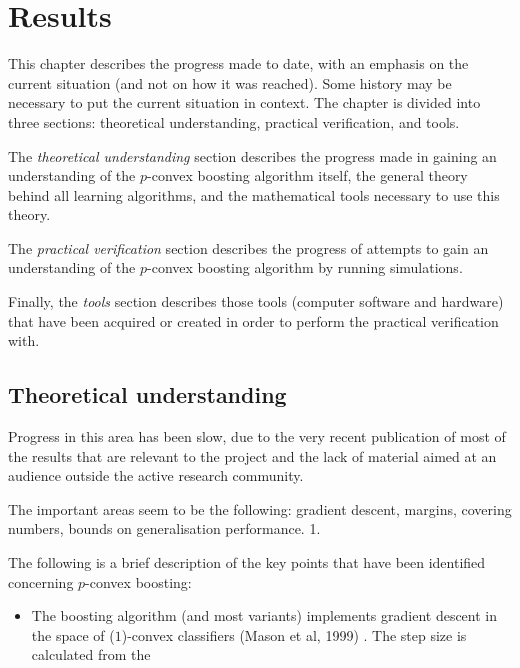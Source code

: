 \chapter{Results}



This chapter describes the progress made to date, with an emphasis on
the current situation (and not on how it was reached).  Some
history may be necessary to put the current situation in context.  The
chapter is divided into three sections: theoretical understanding,
practical verification, and tools.

The \emph{theoretical understanding} section describes the progress
made in gaining an understanding of the $p$-convex boosting algorithm
itself, the general theory behind all learning algorithms, and the
mathematical tools necessary to use this theory.

The \emph{practical verification} section describes the progress of
attempts to gain an understanding of the $p$-convex boosting algorithm
by running simulations.

Finally, the \emph{tools} section describes those tools (computer
software and hardware) that have been acquired or created in order to
perform the practical verification with.

\section{Theoretical understanding}

Progress in this area has been slow, due to the very recent
publication of most of the results that are relevant to the project
and the lack of material aimed at an audience outside the active
research community.  

The important areas seem to be the following: gradient descent,
margins, covering numbers, bounds on generalisation performance.
1.  


The following is a brief description of the key points that have been
identified concerning $p$-convex boosting:

\begin{itemize}
\item	The boosting algorithm (and most variants) implements gradient
	descent in the space of ($1$)-convex classifiers (Mason et al,
	1999) \cite{Mason99}.  The step size is calculated from the 

\end{itemize}

